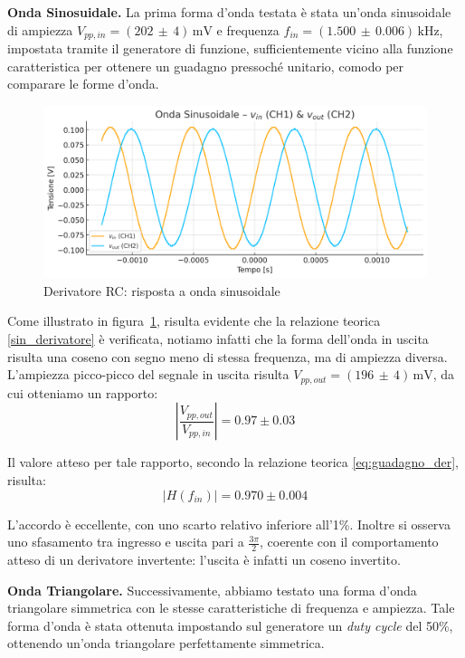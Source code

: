 \documentclass[a4paper,12pt]{article}
\begin{document}
\vspace{0.3cm}
\textbf{Onda Sinosuidale.} La prima forma d'onda testata è stata un'onda sinusoidale di ampiezza \(V_{pp,in} = (202\,\pm\,4)\,\mathrm{mV}\) e frequenza \(f_{in} = (1.500\,\pm\,0.006)\,\mathrm{kHz}\), impostata tramite il generatore di funzione, sufficientemente vicino alla funzione caratteristica per ottenere un guadagno pressoché unitario, comodo per comparare le forme d'onda.

\begin{figure}[H]
  \centering
  \includegraphics[width=.8\textwidth]{Sinosuidale.png}
  \caption{Derivatore RC: risposta a onda sinusoidale}
  \label{fig:derivatore_sin}
\end{figure}

Come illustrato in figura~\ref{fig:derivatore_sin}, risulta evidente che la relazione teorica \eqref{sin_derivatore} è verificata, notiamo infatti che la forma dell'onda in uscita risulta una coseno con segno meno di stessa frequenza, ma di ampiezza diversa. L'ampiezza picco-picco del segnale in uscita risulta \(V_{pp,out} = (196\,\pm\,4)\,\mathrm{mV}\), da cui otteniamo un rapporto:
\[
\left|\frac{V_{pp, out}}{V_{pp, in}}\right| = 0.97 \pm 0.03
\]

Il valore atteso per tale rapporto, secondo la relazione teorica \ref{eq:guadagno_der}, risulta:
\[
|H(f_{in})| = 0.970 \pm 0.004
\]

L'accordo è eccellente, con uno scarto relativo inferiore all'1\%. Inoltre si osserva uno sfasamento tra ingresso e uscita pari a \(\frac{3\pi}{2}\), coerente con il comportamento atteso di un derivatore invertente: l’uscita è infatti un coseno invertito.

\vspace{0.3cm}
\textbf{Onda Triangolare.} Successivamente, abbiamo testato una forma d’onda triangolare simmetrica con le stesse caratteristiche di frequenza e ampiezza. Tale forma d’onda è stata ottenuta impostando sul generatore un \textit{duty cycle} del 50\%, ottenendo un'onda triangolare perfettamente simmetrica.
\end{document}
